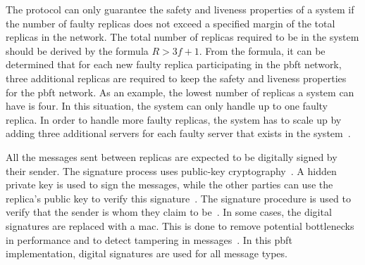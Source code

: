 The protocol can only guarantee the safety and liveness properties of a system if the number of faulty replicas does not exceed a specified margin of the total replicas in the network. The total number of replicas required to be in the system should be derived by the formula $R > 3f + 1$. From the formula, it can be determined that for each new faulty replica participating in the \ac{pbft} network, three additional replicas are required to keep the safety and liveness properties for the \ac{pbft} network.
As an example, the lowest number of replicas a system can have is four. In this situation, the system can only handle up to one faulty replica. In order to handle more faulty replicas, the system has to scale up by adding three additional servers for each faulty server that exists in the system~\cites{SLIDES:PBFT}{WEB:ImpPBFTBlock}[p.~257]{BOOK:BuildDepDistSyst}[p.~403]{PAPER:PBFTRecovery}[p.~3]{PAPER:OGPBFT}.

All the messages sent between replicas are expected to be digitally signed by their sender. The signature process uses public-key cryptography~\cite[p.~257,p.267]{BOOK:BuildDepDistSyst}. A hidden private key is used to sign the messages, while the other parties can use the replica’s public key to verify this signature~\cite[p.~417]{PAPER:PBFTRecovery}. The signature procedure is used to verify that the sender is whom they claim to be~\cite[p.~3]{PAPER:OGPBFT}. In some cases, the digital signatures are replaced with a \ac{mac}. This is done to remove potential bottlenecks in performance and to detect tampering in messages~\cites{WEB:UnderpBFT}[p.~257]{BOOK:BuildDepDistSyst}[p.~3,8]{PAPER:OGPBFT}. In this \ac{pbft} implementation, digital signatures are used for all message types.

